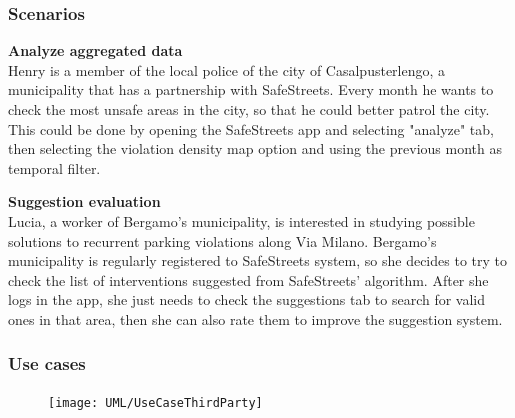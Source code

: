 \subsubsection{Scenarios}
\textbf{Analyze aggregated data}\\
    Henry is a member of the local police of the city of Casalpusterlengo, a municipality that has a partnership with SafeStreets. Every month he wants to check the most unsafe areas in the city, so that he could better patrol the city. This could be done by opening the SafeStreets app and selecting "analyze" tab, then selecting the violation density map option and using the previous month as temporal filter.
    
\textbf{Suggestion evaluation}\\
    Lucia, a worker of Bergamo's municipality, is interested in studying possible solutions to recurrent parking violations along Via Milano. Bergamo's municipality is regularly registered to SafeStreets system, so she decides to try to check the list of interventions suggested from SafeStreets' algorithm. After she logs in the app, she just needs to check the suggestions tab to search for valid ones in that area, then she can also rate them to improve the suggestion system.


\subsubsection{Use cases}
\begin{figure}[H]
        \centering
        \texttt{[image: UML/UseCaseThirdParty]}
\end{figure}

